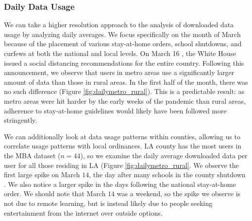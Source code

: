 \subsubsection{Daily Data Usage}
We can take a higher resolution approach to the analysis of downloaded data usage by analyzing daily averages. We focus specifically on the month of March because of the placement of various stay-at-home orders, school shutdowns, and curfews at both the national and local levels. On March 16 \cite{trump2020coronavirus}, the White House issued a social distancing recommendations for the entire country. Following this announcement, we observe that users in metro areas use a significantly larger amount of data than those in rural areas. In the first half of the month, there was no such difference (Figure \ref{fig:dailymetro_rural}). This is a predictable result: as metro areas were hit harder by the early weeks of the pandemic than rural areas, adherence to stay-at-home guidelines would likely have been followed more stringently. 

We can additionally look at data usage patterns within counties, allowing us to correlate usage patterns with local ordinances. LA county has the most users in the MBA dataset ($n=44$), so we examine the daily average downloaded data per user for all those residing in LA (Figure \ref{fig:dailymetro_rural}. We observe the first large spike on March $14$, the day after many schools in the county shutdown \cite{haire2020LA}. We also notice a larger spike in the days following the national stay-at-home order. We should note that March $14$ was a weekend, so the spike we observe is not due to remote learning, but is instead likely due to people seeking entertainment from the internet over outside options. 

